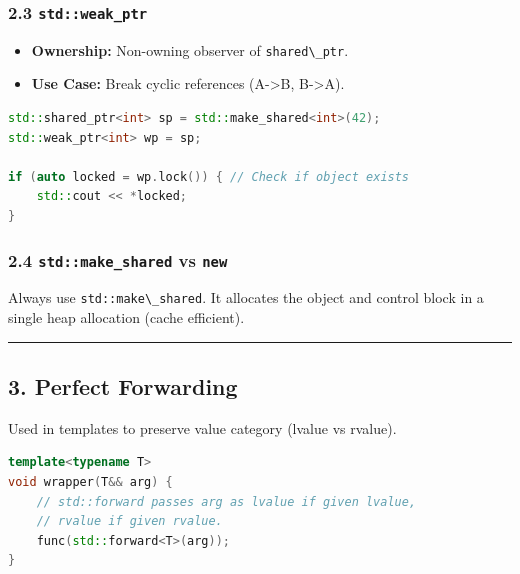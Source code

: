 \hypertarget{stdweak_ptr}{%
\subsubsection{\texorpdfstring{2.3
\texttt{std::weak\_ptr}}{2.3 std::weak\_ptr}}\label{stdweak_ptr}}

\begin{itemize}
\tightlist
\item
  \textbf{Ownership:} Non-owning observer of
  \passthrough{\lstinline!shared\_ptr!}.
\item
  \textbf{Use Case:} Break cyclic references (A-\textgreater B,
  B-\textgreater A).
\end{itemize}

\begin{lstlisting}[language={C++}]
std::shared_ptr<int> sp = std::make_shared<int>(42);
std::weak_ptr<int> wp = sp;

if (auto locked = wp.lock()) { // Check if object exists
    std::cout << *locked;
}
\end{lstlisting}

\hypertarget{stdmake_shared-vs-new}{%
\subsubsection{\texorpdfstring{2.4 \texttt{std::make\_shared} vs
\texttt{new}}{2.4 std::make\_shared vs new}}\label{stdmake_shared-vs-new}}

Always use \passthrough{\lstinline!std::make\_shared!}. It allocates the
object and control block in a single heap allocation (cache efficient).

\begin{center}\rule{0.5\linewidth}{0.5pt}\end{center}

\hypertarget{perfect-forwarding}{%
\subsection{3. Perfect Forwarding}\label{perfect-forwarding}}

Used in templates to preserve value category (lvalue vs rvalue).

\begin{lstlisting}[language={C++}]
template<typename T>
void wrapper(T&& arg) {
    // std::forward passes arg as lvalue if given lvalue,
    // rvalue if given rvalue.
    func(std::forward<T>(arg));
}
\end{lstlisting}

